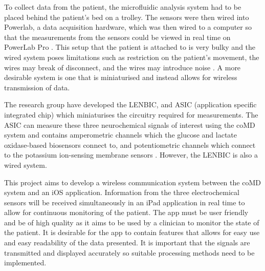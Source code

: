 To collect data from the patient, the microfluidic analysis system had to be placed behind the patient's bed on a trolley. The sensors were then wired into Powerlab, a data acquisition hardware, which was then wired to a computer so that the measurements from the sensors could be viewed in real time on PowerLab Pro \cite{Rogers2017}. This setup that the patient is attached to is very bulky and the wired system poses limitations such as restriction on the patient's movement, the wires may break of disconnect, and the wires may introduce noise \cite{Ferguson2011}. A more desirable system is one that is miniaturised and instead allows for wireless transmission of data.

The research group have developed the LENBIC, and ASIC (application specific integrated chip) which miniaturises the circuitry required for measurements. The ASIC can measure these three neurochemical signals of interest using the coMD system and contains amperometric channels which the glucose and lactate oxidase-based biosensors connect to, and potentiometric channels which connect to the potassium ion-sensing membrane sensors \cite{Pagkalos2017, Rogers2017}. However, the LENBIC is also a wired system. 

This project aims to develop a wireless communication system between the coMD system and an iOS application. Information from the three electrochemical sensors will be received simultaneously in an iPad application in real time to allow for continuous monitoring of the patient. The app must be user friendly and be of high quality as it aims to be used by a clinician to monitor the state of the patient. It is desirable for the app to contain features that allows for easy use and easy readability of the data presented. It is important that the signals are transmitted and displayed accurately so suitable processing methods need to be implemented. 

